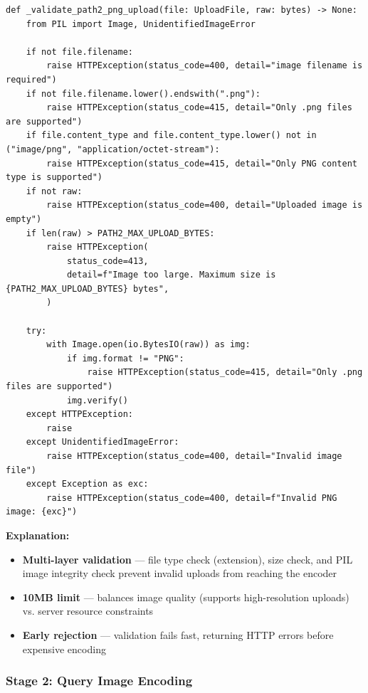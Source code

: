 \begin{lstlisting}[caption={PATH 2 Upload Validation --- api/main.py}]
def _validate_path2_png_upload(file: UploadFile, raw: bytes) -> None:
    from PIL import Image, UnidentifiedImageError

    if not file.filename:
        raise HTTPException(status_code=400, detail="image filename is required")
    if not file.filename.lower().endswith(".png"):
        raise HTTPException(status_code=415, detail="Only .png files are supported")
    if file.content_type and file.content_type.lower() not in ("image/png", "application/octet-stream"):
        raise HTTPException(status_code=415, detail="Only PNG content type is supported")
    if not raw:
        raise HTTPException(status_code=400, detail="Uploaded image is empty")
    if len(raw) > PATH2_MAX_UPLOAD_BYTES:
        raise HTTPException(
            status_code=413,
            detail=f"Image too large. Maximum size is {PATH2_MAX_UPLOAD_BYTES} bytes",
        )

    try:
        with Image.open(io.BytesIO(raw)) as img:
            if img.format != "PNG":
                raise HTTPException(status_code=415, detail="Only .png files are supported")
            img.verify()
    except HTTPException:
        raise
    except UnidentifiedImageError:
        raise HTTPException(status_code=400, detail="Invalid image file")
    except Exception as exc:
        raise HTTPException(status_code=400, detail=f"Invalid PNG image: {exc}")
\end{lstlisting}

\textbf{Explanation:}
\begin{itemize}
    \item \textbf{Multi-layer validation} --- file type check (extension), size check, and PIL image integrity check prevent invalid uploads from reaching the encoder
    \item \textbf{10MB limit} --- balances image quality (supports high-resolution uploads) vs. server resource constraints
    \item \textbf{Early rejection} --- validation fails fast, returning HTTP errors before expensive encoding
\end{itemize}

\subsubsection{Stage 2: Query Image Encoding}

